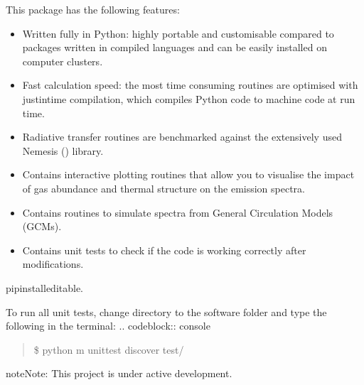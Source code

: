 \documentclass[letterpaper,10pt,english]{sphinxmanual}
\begin{document}
\sphinxAtStartPar
This package has the following features:
\begin{itemize}
\item {} 
\sphinxAtStartPar
Written fully in Python: highly portable and customisable compared
to packages written in compiled languages and
can be easily installed on computer clusters.

\item {} 
\sphinxAtStartPar
Fast calculation speed: the most time consuming routines are optimised with
just\sphinxhyphen{}in\sphinxhyphen{}time compilation, which compiles Python code to machine
code at run time.

\item {} 
\sphinxAtStartPar
Radiative transfer routines are benchmarked against
the extensively used Nemesis () library.

\item {} 
\sphinxAtStartPar
Contains interactive plotting routines that allow you
to visualise the impact of gas abundance and thermal
structure on the emission spectra.

\item {} 
\sphinxAtStartPar
Contains routines to simulate spectra from General
Circulation Models (GCMs).

\item {} 
\sphinxAtStartPar
Contains unit tests to check if
the code is working correctly after modifications.

\end{itemize}

\begin{sphinxVerbatim}[commandchars=\\\{\}]
pipinstall\PYGZhy{}\PYGZhy{}editable.
\end{sphinxVerbatim}

\sphinxAtStartPar
To run all unit tests, change directory to the software folder and type the
following in the terminal:
.. code\sphinxhyphen{}block:: console
\begin{quote}

\sphinxAtStartPar
\$ python \sphinxhyphen{}m unittest discover test/
\end{quote}

\begin{sphinxadmonition}{note}{Note:}
\sphinxAtStartPar
This project is under active development.
\end{sphinxadmonition}
\end{document}
